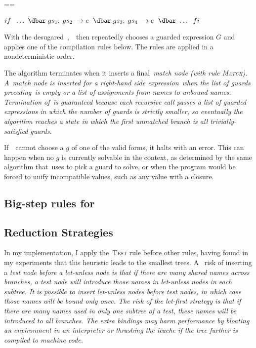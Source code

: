\documentclass[manuscript,screen, 12pt, nonacm]{acmart}
\begin{document}
    ==
    
    ${if\;~\dots~\dbar\; gs_{1};\; gs_{2}~\rightarrow e~\;\dbar\; gs_{3};\; gs_{4}~\rightarrow e~\;\dbar~\dots~\;fi}$

    With the desugared~\iffibf,~\Compile\ then repeatedly chooses a guarded
    expression $G$ and applies one of the compilation rules below. The rules are
    applied in a nondeterministic order. 

    The algorithm terminates when it inserts a final~\it{match} node (with rule
    \textsc{Match}).  A~\it{match} node is inserted for a right-hand side expression~\expr when the list of
    guards preceding~\expr is empty or a list of assignments from names to
    unbound names. Termination of~\DTran\~is guaranteed because each recursive
    call passes a list of guarded expressions in which the number of guards is
    strictly smaller, so eventually the algorithm reaches a state in which the
    first unmatched branch is all trivially-satisfied guards.


    If~\Compile\ cannot choose a $g$ of
    one of the valid forms, it halts with an error. This
    can happen when no $g$ is currently solvable in the context, as determined
    by the same algorithm that~\VMinus uses to pick a guard to solve, or when
    the program would be forced to unify incompatible values, such as any value
    with a closure. 

      \subsection{Big-step rules for \Compile}
        \compiler

      \subsection{Reduction Strategies}

      In my implementation, I apply the~\textsc{Test} rule before other rules,
      having found in my experiments that this heuristic leads to the smallest trees. A~%
      risk of inserting a \it{test} node before a \it{let-unless} node is that
      if there are many shared names across branches, a \it{test} node
      will introduce those names in \it{let-unless} nodes in each
      subtree.
      It is possible to insert \it{let-unless} nodes before \it{test}
      nodes, in which case those names will be bound
      only once.  The risk of the \it{let}-first strategy
      is that if there are many names used in only one subtree of a \it{test},
      these names will be introduced to \it{all} branches.  The extra
      bindings may harm
      performance by bloating an environment in an interpreter or thrashing the
      icache if the tree further is compiled to machine code. 
\end{document}
